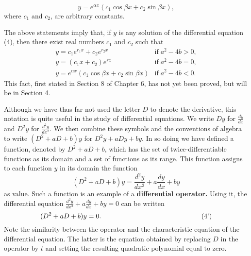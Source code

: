 $$
y = e^{\alpha x}(c_1 \cos \beta x + c_2 \sin \beta x), 
$$
where $c_1$ and $c_2$, are arbitrary constants.

The above statements imply that, if $y$ is any solution of the differential equation (4), then there exist real numbers $c_1$ and $c_2$ such that
$$
\begin{array}{ll}
y = c_1 e^{r_1x} + c_2 e^{r_2 x} &\mbox{if}\; a^2 - 4b > 0, \\
y = (c_1x + c_2)e^{rx}                 &\mbox{if}\; a^2 - 4b = 0, \\
y = e^{\alpha x}(c_1 \cos \beta x + c_2 \sin \beta x) &\mbox{if}\; a^2 - 4b < 0.
\end{array}
$$
This fact, first stated in Section 8 of Chapter 6, has not yet been proved, but will be in Section 4.

Although we have thus far not used the letter $D$ to denote the derivative, this notation is quite useful in the study of differential equations. We write $Dy$ for $\frac{dy}{dx}$ and $D^2y$ for $\frac{d^2y}{dx^2}$. We then combine these symbols and the conventions of algebra to write $(D^2 + aD + b)y$ for $D^2y + aDy + by$. In so doing we have defined a function, denoted by $D^2 + aD + b$, which has the set of twice-differentiable functions as its domain and a set of functions as its range. This function assigns to each function $y$ in its domain the function
$$
(D^2 + aD + b)y = \frac{d^2y}{dx^2} + a\frac{dy}{dx} + by
$$
as value. Such a function is an example of a \textbf{differential operator.} Using it, the differential equation $\frac{d^2y}{dx^2} + a \frac{dy}{dx} + by = 0$ can be written
$$
(D^2 + aD + b)y = 0. \mbox{\hspace{2in} (4')}
$$
Note the similarity between the operator and the characteristic equation of the differential equation. The latter is the equation obtained by replacing $D$ in the operator by $t$ and setting the resulting quadratic polynomial equal to zero.

